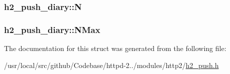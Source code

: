\subsubsection[{\texorpdfstring{N}{N}}]{ h2\+\_\+push\+\_\+diary\+::N}\hypertarget{structh2__push__diary_a2e2734c51d3a9b23e2b01f509970ce80}{}\label{structh2__push__diary_a2e2734c51d3a9b23e2b01f509970ce80}
\subsubsection[{\texorpdfstring{N\+Max}{NMax}}]{ h2\+\_\+push\+\_\+diary\+::\+N\+Max}\hypertarget{structh2__push__diary_a8c37e39d0dbd632c4767198974c5d20e}{}\label{structh2__push__diary_a8c37e39d0dbd632c4767198974c5d20e}


The documentation for this struct was generated from the following file\+:\begin{DoxyCompactItemize}
\item 
/usr/local/src/github/\+Codebase/httpd-\/2../modules/http2/\hyperlink{h2__push_8h}{h2\+\_\+push.\+h}\end{DoxyCompactItemize}
